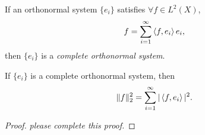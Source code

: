 \begin{defn}
    If an orthonormal system $\{e_{i}\}$ satisfies 
    $\forall f\in L^{2}(X)$, 
    \begin{displaymath}
        f=\sum_{i=1}^{\infty}\left\langle f,e_i \right\rangle e_{i},
    \end{displaymath}    
    then $\{e_{i}\}$ is a \textit{complete orthonormal system}.
\end{defn}
\begin{thm}
    \label{Thm:Parseval}
    If $\{e_{i}\}$ is a complete orthonormal system, 
    then 
    \begin{displaymath}
        \|f\|_{2}^{2}=\sum_{i=1}^{\infty}|\left\langle f,e_{i} \right\rangle|^{2}.
    \end{displaymath}
\end{thm}
\begin{proof}
    \textit{please complete this proof.}
\end{proof}
